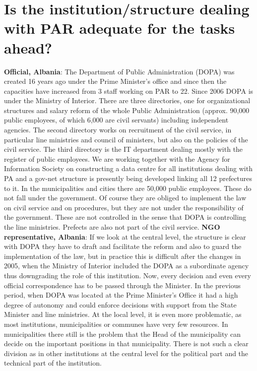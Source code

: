 \section{Is the institution/structure dealing with PAR adequate for the tasks ahead? }
\textbf{Official, Albania}: The Department of Public Administration (DOPA) was created 16 years ago under the Prime Minister’s office and since then the capacities have increased from 3 staff working on PAR to 22. Since 2006 DOPA is under the Ministry of Interior. There are three directories, one for organizational structures and salary reform of the whole Public Administration (approx. 90,000 public employees, of which 6,000 are civil servants) including independent agencies. The second directory works on recruitment of the civil service, in particular line ministries and council of ministers, but also on the policies of the civil service. The third directory is the IT department dealing mostly with the register of public employees. We are working together with the Agency for Information Society on constructing a data centre for all institutions dealing with PA and a gov-net structure is presently being developed linking all 12 prefectures to it. In the municipalities and cities there are 50,000 public employees. These do not fall under the government. Of course they are obliged to implement the law on civil service and on procedures, but they are not under the responsibility of the government. These are not controlled in the sense that DOPA is controlling the line ministries. Prefects are also not part of the civil service.
\textbf{NGO representative, Albania}: If we look at the central level, the structure is clear with DOPA they have to draft and facilitate the reform and also to guard the implementation of the law, but in practice this is difficult after the changes in 2005, when the Ministry of Interior included the DOPA as a subordinate agency thus downgrading the role of this institution. Now, every decision and even every official correspondence has to be passed through the Minister. In the previous period, when DOPA was located at the Prime Minister’s Office it had a high degree of autonomy and could enforce decisions with support from the State Minister and line ministries. At the local level, it is even more problematic, as most institutions, municipalities or communes have very few resources. In municipalities there still is the problem that the Head of the municipality can decide on the important positions in that municipality. There is not such a clear division as in other institutions at the central level for the political part and the technical part of the institution. 
